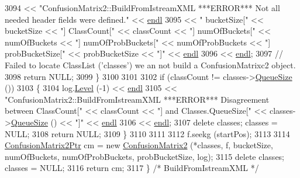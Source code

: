 \begin{DoxyCode}
3094                    << \textcolor{stringliteral}{"ConfusionMatrix2::BuildFromIstreamXML     ***ERROR***    Not all needed header
       fields were defined."}  << \hyperlink{namespace_k_k_b_ad1f50f65af6adc8fa9e6f62d007818a8}{endl}
3095                    << \textcolor{stringliteral}{"  bucketSize["} << bucketSize << \textcolor{stringliteral}{"]  ClassCount["} <<  classCount  <<  \textcolor{stringliteral}{"] 
       numOfBuckets["} << numOfBuckets << \textcolor{stringliteral}{"]  numOfProbBuckets["} << numOfProbBuckets << \textcolor{stringliteral}{"]  probBucketSize["} << probBucketSize 
      << \textcolor{stringliteral}{"]"} << \hyperlink{namespace_k_k_b_ad1f50f65af6adc8fa9e6f62d007818a8}{endl}
3096                    << \hyperlink{namespace_k_k_b_ad1f50f65af6adc8fa9e6f62d007818a8}{endl};
3097     \textcolor{comment}{// Failed to locate ClassList ('classes')  we an not build a ConfusionMatrixc2 object.}
3098     \textcolor{keywordflow}{return} NULL;
3099   \}
3100 
3101 
3102   \textcolor{keywordflow}{if}  (classCount != classes->\hyperlink{class_k_k_b_1_1_k_k_queue_a1dab601f75ee6a65d97f02bddf71c40d}{QueueSize} ())
3103   \{
3104     log.\hyperlink{class_k_k_b_1_1_run_log_a32cf761d7f2e747465fd80533fdbb659}{Level} (-1) << \hyperlink{namespace_k_k_b_ad1f50f65af6adc8fa9e6f62d007818a8}{endl} 
3105                    << \textcolor{stringliteral}{"ConfusionMatrix2::BuildFromIstreamXML    ***ERROR***    Disagreement between
       ClassCount["} << classCount << \textcolor{stringliteral}{"]  and  Classes.QueueSize["} << classes->\hyperlink{class_k_k_b_1_1_k_k_queue_a1dab601f75ee6a65d97f02bddf71c40d}{QueueSize} () << \textcolor{stringliteral}{"]"} << 
      \hyperlink{namespace_k_k_b_ad1f50f65af6adc8fa9e6f62d007818a8}{endl}
3106                    << \hyperlink{namespace_k_k_b_ad1f50f65af6adc8fa9e6f62d007818a8}{endl};
3107     \textcolor{keyword}{delete}  classes;  classes = NULL;
3108     \textcolor{keywordflow}{return} NULL;
3109   \}
3110 
3111 
3112   f.seekg (startPos);
3113 
3114   \hyperlink{class_k_k_m_l_l_1_1_confusion_matrix2}{ConfusionMatrix2Ptr}  cm =   \textcolor{keyword}{new} \hyperlink{class_k_k_m_l_l_1_1_confusion_matrix2_a856d67b4070de16eaa453b4f9c6b9cfa}{ConfusionMatrix2} (*classes, f, 
      bucketSize, numOfBuckets, numOfProbBuckets, probBucketSize, log);
3115   \textcolor{keyword}{delete}  classes;  classes = NULL;
3116   \textcolor{keywordflow}{return}  cm;
3117 \}   \textcolor{comment}{/* BuildFromIstreamXML */}
\end{DoxyCode}
